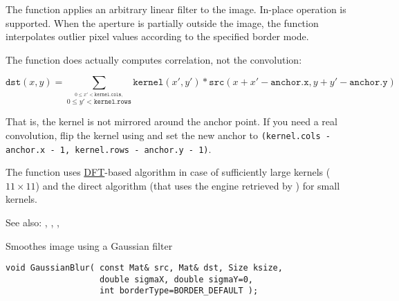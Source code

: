 The function applies an arbitrary linear filter to the image. In-place operation is supported. When the aperture is partially outside the image, the function interpolates outlier pixel values according to the specified border mode.

The function does actually computes correlation, not the convolution:

\[
\texttt{dst}(x,y) = \sum_{\stackrel{0\leq x' < \texttt{kernel.cols},}{0\leq y' < \texttt{kernel.rows}}} \texttt{kernel}(x',y')*\texttt{src}(x+x'-\texttt{anchor.x},y+y'-\texttt{anchor.y})
\]

That is, the kernel is not mirrored around the anchor point. If you need a real convolution, flip the kernel using  and set the new anchor to \texttt{(kernel.cols - anchor.x - 1, kernel.rows - anchor.y - 1)}.

The function uses \hyperref[dft]{DFT}-based algorithm in case of sufficiently large kernels (~$11\times11$) and the direct algorithm (that uses the engine retrieved by ) for small kernels.

See also: , , , 

Smoothes image using a Gaussian filter

\begin{lstlisting}
void GaussianBlur( const Mat& src, Mat& dst, Size ksize,
                   double sigmaX, double sigmaY=0,
                   int borderType=BORDER_DEFAULT );
\end{lstlisting}
\begin{description}
\end{description}


